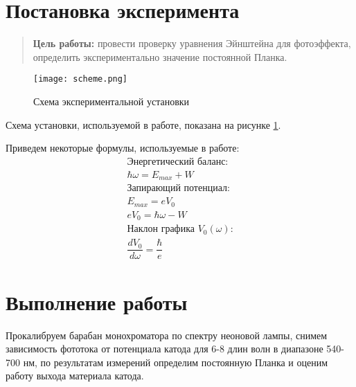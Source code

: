 \documentclass{lab}
\begin{document}

\section*{Постановка эксперимента}

\begin{quote}
	\textbf{{\normalsize Цель работы: }}провести проверку уравнения Эйнштейна для фотоэффекта, определить экспериментально значение постоянной Планка.
\end{quote}

\begin{figure}[H]
	\centering
	\texttt{[image: scheme.png]}
	\caption{Схема экспериментальной установки}
	\label{scheme1}
\end{figure}


Схема установки, используемой в работе, показана на рисунке \ref{scheme1}.

Приведем некоторые формулы, используемые в работе:
\begin{gather*}
\text{Энергетический баланс:}\\
\hbar\omega = E_{max} + W\\
\text{Запирающий потенциал:}\\
E_{max} = eV_0\\
eV_0 = \hbar\omega - W\\
\text{Наклон графика $V_0(\omega)$:}\\
\dfrac{dV_0}{d\omega} = \dfrac{\hbar}{e}
\end{gather*}

\section*{Выполнение работы}

Прокалибруем барабан монохроматора по спектру неоновой лампы, снимем зависимость фототока от потенциала катода для 6-8 длин волн в диапазоне 540-700 нм, по результатам измерений определим постоянную Планка и оценим работу выхода материала катода.
\end{document}
